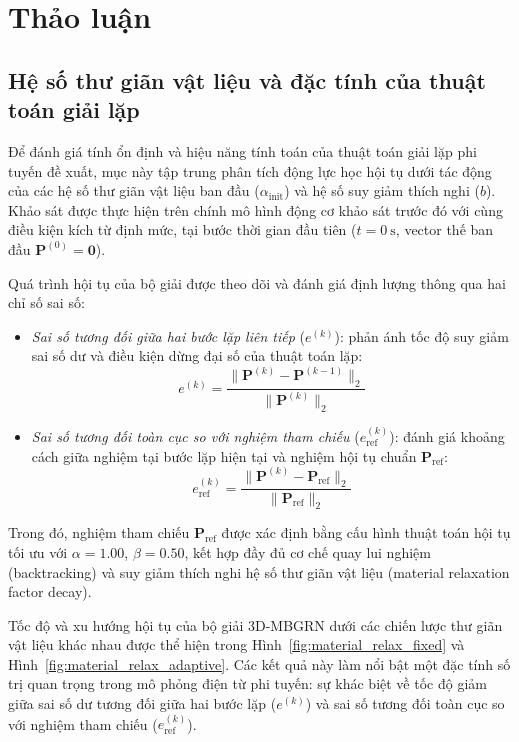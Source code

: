 \section{Thảo luận}
\subsection{Hệ số thư giãn vật liệu và đặc tính của thuật toán giải lặp}

Để đánh giá tính ổn định và hiệu năng tính toán của thuật toán giải lặp phi tuyến đề xuất, mục này tập trung phân tích động lực học hội tụ dưới tác động của các hệ số thư giãn vật liệu ban đầu ($\alpha_{\text{init}}$) và hệ số suy giảm thích nghi ($b$). Khảo sát được thực hiện trên chính mô hình động cơ khảo sát trước đó với cùng điều kiện kích từ định mức, tại bước thời gian đầu tiên ($t = 0~\text{s}$, vector thế ban đầu $\mathbf{P}^{(0)} = \mathbf{0}$).

Quá trình hội tụ của bộ giải được theo dõi và đánh giá định lượng thông qua hai chỉ số sai số:
\begin{itemize}
    \item \textit{Sai số tương đối giữa hai bước lặp liên tiếp} ($e^{(k)}$): phản ánh tốc độ suy giảm sai số dư và điều kiện dừng đại số của thuật toán lặp:
    \begin{equation}
        e^{(k)} = \frac{\|\mathbf{P}^{(k)} - \mathbf{P}^{(k-1)}\|_2}{\|\mathbf{P}^{(k)}\|_2}
    \end{equation}
    \item \textit{Sai số tương đối toàn cục so với nghiệm tham chiếu} ($e_{\text{ref}}^{(k)}$): đánh giá khoảng cách giữa nghiệm tại bước lặp hiện tại và nghiệm hội tụ chuẩn $\mathbf{P}_{\text{ref}}$:
    \begin{equation}
        e_{\text{ref}}^{(k)} = \frac{\|\mathbf{P}^{(k)} - \mathbf{P}_{\text{ref}}\|_2}{\|\mathbf{P}_{\text{ref}}\|_2}
    \end{equation}
\end{itemize}
Trong đó, nghiệm tham chiếu $\mathbf{P}_{\text{ref}}$ được xác định bằng cấu hình thuật toán hội tụ tối ưu với $\alpha = 1.00$, $\beta = 0.50$, kết hợp đầy đủ cơ chế quay lui nghiệm (backtracking) và suy giảm thích nghi hệ số thư giãn vật liệu (material relaxation factor decay).

Tốc độ và xu hướng hội tụ của bộ giải 3D-MBGRN dưới các chiến lược thư giãn vật liệu khác nhau được thể hiện trong Hình~\ref{fig:material_relax_fixed} và Hình~\ref{fig:material_relax_adaptive}. Các kết quả này làm nổi bật một đặc tính số trị quan trọng trong mô phỏng điện từ phi tuyến: sự khác biệt về tốc độ giảm giữa sai số dư tương đối giữa hai bước lặp ($e^{(k)}$) và sai số tương đối toàn cục so với nghiệm tham chiếu ($e_{\text{ref}}^{(k)}$).

